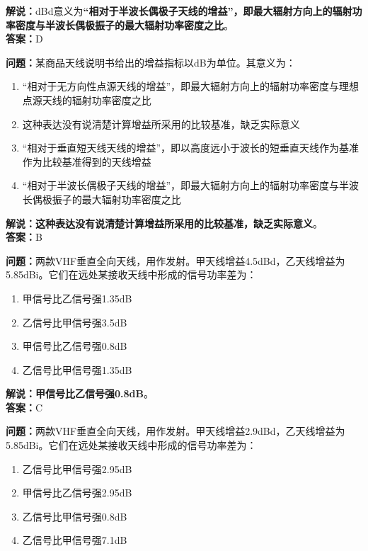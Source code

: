 \documentclass{ctexbook}
\begin{document}
\noindent\textbf{解说：}dBd意义为\textbf{“相对于半波长偶极子天线的增益”，即最大辐射方向上的辐射功率密度与半波长偶极振子的最大辐射功率密度之比}。\\\noindent\textbf{答案：}D


\bigskip


\noindent\textbf{问题：}某商品天线说明书给出的增益指标以dB为单位。其意义为：

\begin{enumerate}[label=\Alph*), leftmargin=3em]
	\item “相对于无方向性点源天线的增益”，即最大辐射方向上的辐射功率密度与理想点源天线的辐射功率密度之比
	\item 这种表达没有说清楚计算增益所采用的比较基准，缺乏实际意义
	\item “相对于垂直短天线天线的增益”，即以高度远小于波长的短垂直天线作为基准作为比较基准得到的天线增益
	\item “相对于半波长偶极子天线的增益”，即最大辐射方向上的辐射功率密度与半波长偶极振子的最大辐射功率密度之比
\end{enumerate}

\noindent\textbf{解说：这种表达没有说清楚计算增益所采用的比较基准，缺乏实际意义}。\\\noindent\textbf{答案：}B


\bigskip


\noindent\textbf{问题：}两款VHF垂直全向天线，用作发射。甲天线增益4.5dBd，乙天线增益为5.85dBi。它们在远处某接收天线中形成的信号功率差为：

\begin{enumerate}[label=\Alph*), leftmargin=3em]
	\item 甲信号比乙信号强1.35dB
	\item 乙信号比甲信号强3.5dB
	\item 甲信号比乙信号强0.8dB
	\item 乙信号比甲信号强1.35dB
\end{enumerate}

\noindent\textbf{解说：甲信号比乙信号强0.8dB}。\\\noindent\textbf{答案：}C%


\bigskip


\noindent\textbf{问题：}两款VHF垂直全向天线，用作发射。甲天线增益2.9dBd，乙天线增益为5.85dBi。它们在远处某接收天线中形成的信号功率差为：

\begin{enumerate}[label=\Alph*), leftmargin=3em]
	\item 乙信号比甲信号强2.95dB
	\item 甲信号比乙信号强2.95dB
	\item 乙信号比甲信号强0.8dB
	\item 乙信号比甲信号强7.1dB
\end{enumerate}
\end{document}
